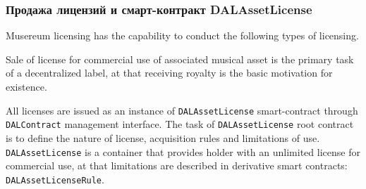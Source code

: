 \documentclass[12pt]{report}
\newcommand{\hlc}[1]{\colorbox{yellow!25}{#1}}
\def\code#1{\colorbox{light-gray}{\texttt{#1}}}
\begin{document}
\subsubsection{Продажа лицензий и смарт-контракт DALAssetLicense}
\label{tech-apps-dal-license}

Musereum licensing has the capability to conduct the following types of licensing.

Sale of license for commercial use of associated musical asset is the primary task of a decentralized label, at that receiving royalty is the basic motivation for existence.

All licenses are issued as \hlc{an instance} of \code{DALAssetLicense} smart-contract through \code{DALContract} management interface.
The task of \code{DALAssetLicense} root contract is to define the nature of license, acquisition rules and  limitations of use. \code{DALAssetLicense} is a container that provides holder with an unlimited license for commercial use, at that limitations are described in derivative smart contracts:
 \code{DALAssetLicenseRule}.

\end{document}
